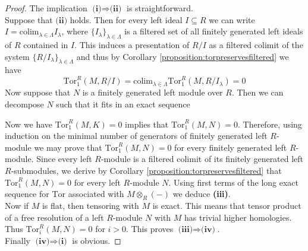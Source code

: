\begin{proof}
The implication $\textbf{(i)}\Rightarrow \textbf{(ii)}$ is straightforward.\\
Suppose that $\textbf{(ii)}$ holds. Then for every left ideal $I\subseteq R$ we can write $I=\mathrm{colim}_{\lambda\in \Lambda}I_{\lambda}$, where $\{I_{\lambda}\}_{\lambda\in \Lambda}$ is a filtered set of all finitely generated left ideals of $R$ contained in $I$. This induces a presentation of $R/I$ as a filtered colimit of the system $\{R/I_{\lambda}\}_{\lambda\in \Lambda}$ and thus by Corollary \ref{proposition:torpreservesfiltered} we have
$$\mathrm{Tor}^R_1(M,R/I)=\mathrm{colim}_{\lambda\in \Lambda}\mathrm{Tor}^R_1(M,R/I_{\lambda})=0$$
Now suppose that $N$ is a finitely generated left module over $R$. Then we can decompose $N$ such that it fits in an exact sequence
\begin{center}
\end{center}
Now we have $\mathrm{Tor}^R_1(M,K)=0$ implies that $\mathrm{Tor}^R_1(M,N)=0$. Therefore, using induction on the minimal number of generators of finitely generated left $R$-module we may prove that $\mathrm{Tor}^R_1(M,N)=0$ for every finitely generated left $R$-module. Since every left $R$-module is a filtered colimit of its finitely generated left $R$-submodules, we derive by Corollary \ref{proposition:torpreservesfiltered} that $\mathrm{Tor}^R_1(M,N)=0$ for every left $R$-module $N$. Using first terms of the long exact sequence for $\mathrm{Tor}$ associated with $M\otimes_R(-)$ we deduce \textbf{(iii)}.\\
Now if $M$ is flat, then tensoring with $M$ is exact. This means that tensor product of a free resolution of a left $R$-module $N$ with $M$ has trivial higher homologies. Thus $\mathrm{Tor}^R_i(M,N)=0$ for $i>0$. This proves $\textbf{(iii)}\Rightarrow \textbf{(iv)}$.\\
Finally $\textbf{(iv)}\Rightarrow \textbf{(i)}$ is obvious.
\end{proof}


